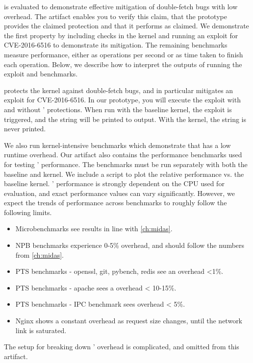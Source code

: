\midas{} is evaluated to demonstrate effective mitigation of
double-fetch bugs with low overhead. 
The artifact enables you to verify this claim, that the 
prototype provides the claimed protection and that it 
performs as claimed.
We demonstrate the first property by including checks in the
kernel and running an exploit for CVE-2016-6516 to demonstrate 
its mitigation.
The remaining benchmarks measure performance, either as operations
per second or as time taken to finish each operation.
Below, we describe how to interpret the outputs of running the exploit
and benchmarks.

\midas{} protects the kernel against double-fetch bugs, and in 
particular mitigates an exploit for CVE-2016-6516.
In our prototype, you will execute the exploit with and without
\midas{}' protections.
When run with the baseline kernel, the exploit is triggered, and the 
string  will be printed to 
 output.
With the \midas{} kernel, the string is never printed.

We also run kernel-intensive benchmarks which demonstrate that
\midas{} has a low runtime overhead. 
Our artifact also contains the performance benchmarks used for
testing \midas{}' performance.
The benchmarks must be run separately with both the baseline and
\midas{} kernel. 
We include a script to plot the relative performance vs. the 
baseline kernel.
\midas{}' performance is strongly dependent on the CPU used for
evaluation, and exact performance values can vary significantly.
However, we expect the trends of performance across benchmarks to
roughly follow the following limits.
\begin{itemize}
  \item Microbenchmarks see results in line with \autoref{ch:midas}.
  \item NPB benchmarks experience 0-5\% overhead, and should follow the 
        numbers from \autoref{ch:midas}.
  \item PTS benchmarks - openssl, git, pybench, redis see an overhead <1\%.
  \item PTS benchmarks - apache sees a overhead < 10-15\%.
  \item PTS benchmarks - IPC benchmark sees overhead < 5\%.
  \item Nginx shows a constant overhead as request size changes, until the
        network link is saturated.
\end{itemize}

The setup for breaking down \midas{}' overhead is complicated, and omitted
from this artifact.

